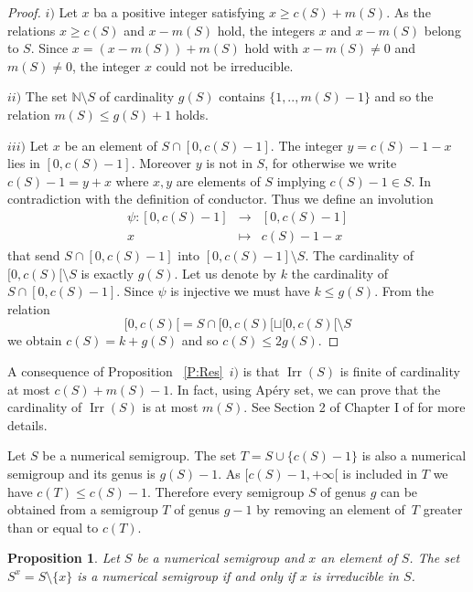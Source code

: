 \documentclass[reqno,11pt]{amsart}
\theoremstyle{plain}
\newtheorem{prop}{Proposition}[section]
\theoremstyle{definition}
\renewcommand{\leq}{\leqslant}
\renewcommand{\geq}{\geqslant}
\newcommand{\NN}{\mathbb{N}}
\DeclareMathOperator{\Irr}{Irr}
\begin{document}
\begin{proof}
$i)$ Let $x$ ba a positive integer satisfying $x \geq c(S)+m(S)$. 
As the relations $x\geq c(S)$ and $x-m(S)$ hold, the integers $x$ and $x-m(S)$ belong to $S$.
Since $x=(x-m(S))+m(S)$ hold with $x-m(S)\not=0$ and $m(S)\not=0$, the integer $x$ could not be irreducible.

$ii)$ The set $\NN\setminus{S}$ of cardinality $g(S)$ contains $\{1,..,m(S)-1\}$ and so the relation $m(S)\leq g(S)+1$ holds.

$iii)$ Let $x$ be an element of $S\cap[0,c(S)-1]$. 
The integer $y=c(S)-1-x$ lies in $[0,c(S)-1]$. 
Moreover $y$ is not in $S$, for otherwise  we write $c(S)-1=y+x$ where $x,y$ are elements of $S$ implying $c(S)-1\in S$. 
In contradiction with the definition of conductor. 
Thus we define an involution 
\[
\begin{array}{rcl}
\psi:[0,c(S)-1]&\to&[0,c(S)-1]\\
x&\mapsto&c(S)-1-x
\end{array}
\]
that send $S\cap[0,c(S)-1]$ into $[0,c(S)-1]\setminus S$.
The cardinality of $[0,c(S)[\setminus S$ is exactly $g(S)$. Let us denote by $k$ the cardinality  of $S\cap[0,c(S)-1]$. 
Since $\psi$ is injective we must have $k\leq g(S)$. 
From the relation 
\[
[0,c(S)[=S\cap[0,c(S)[\sqcup[0,c(S)[\setminus S
\]
 we obtain $c(S)=k+g(S)$ and so $c(S)\leq 2 g(S)$.
\end{proof}

A consequence of Proposition~ \ref{P:Res}~$i)$ is that $\Irr(S)$ is finite of cardinality at most $c(S)+m(S)-1$.
In fact, using Apéry set, we can prove that  the cardinality of $\Irr(S)$ is at most $m(S)$. See Section 2 of Chapter I of \cite{BookNS} for more details.

Let  $S$ be a numerical semigroup. The set $T=S\cup\{c(S)-1\}$ is also a numerical  semigroup and its genus is $g(S)-1$. 
As  $[c(S)-1,+\infty[$ is included in $T$ we have $c(T)\leq c(S)-1$. 
Therefore every semigroup $S$ of genus $g$ can be obtained from a semigroup $T$ of genus $g-1$ by removing an element of~$T$ greater than or equal to $c(T)$.

\begin{prop}
\label{P:Sx}
Let $S$ be a numerical semigroup and $x$ an element of $S$. The set~$S^x=S\setminus\{x\}$ is a numerical semigroup if and only if $x$ is irreducible in $S$.
\end{prop}
\end{document}
